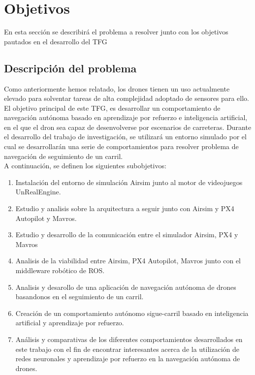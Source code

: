 \chapter{Objetivos}
\label{cap:capitulo2}


En esta sección se describirá el problema a resolver junto con los objetivos pautados en el desarrollo del TFG


\section{Descripción del problema}
\label{sec:descripcion}

Como anteriormente hemos relatado, los drones tienen un uso actualmente elevado para solventar tareas de alta complejidad adoptado de sensores para ello. \\

El objetivo principal de este TFG, es desarrollar un comportamiento de navegación autónoma basado en aprendizaje por refuerzo e inteligencia artificial, en el que el dron sea capaz de desenvolverse por escenarios de carreteras. Durante el desarrollo del trabajo de investigación, se utilizará un entorno simulado por el cual se desarrollarán una serie de comportamientos para resolver problema de navegación de seguimiento de un carril. \\

A continuación, se definen los siguientes subobjetivos: 

\begin{enumerate}
    \item Instalación del entorno de simulación Airsim junto al motor de videojuegos UnRealEngine. 
    \item Estudio y analisis sobre la arquitectura a seguir junto con Airsim y PX4 Autopilot y Mavros. 
    \item Estudio y desarrollo de la comunicación entre el simulador Airsim, PX4 y Mavros
    \item Analisis de la viabilidad entre Airsim, PX4 Autopilot, Mavros junto con el middleware robótico de ROS.
    \item Analisis y desarollo de una aplicación de navegación autónoma de drones basandonos en el seguimiento de un carril.
    \item Creación de un comportamiento autónomo sigue-carril basado en inteligencia artificial y aprendizaje por refuerzo. 
    \item Análisis y comparativas de los diferentes comportamientos desarrollados en este trabajo con el fin de encontrar interesantes acerca de la utilización de redes neuronales y aprendizaje por refuerzo en la navegación autónoma de drones.
\end{enumerate}

